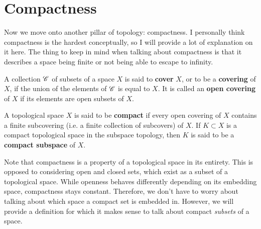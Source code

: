 \section{Compactness} 

  Now we move onto another pillar of topology: compactness. I personally think compactness is the hardest conceptually, so I will provide a lot of explanation on it here. The thing to keep in mind when talking about compactness is that it describes a space being finite or not being able to escape to infinity.  
  
  \begin{definition}[Covers]
    A collection $\operatorname{\mathscr{C}}$ of subsets of a space $X$ is said to \textbf{cover} $X$, or to be a \textbf{covering} of $X$, if the union of the elements of $\operatorname{\mathscr{C}}$ is equal to $X$. It is called an \textbf{open covering} of $X$ if its elements are open subsets of $X$. 
  \end{definition}

  \begin{definition}
    A topological space $X$ is said to be \textbf{compact} if every open covering of $X$ contains a finite subcovering (i.e. a finite collection of subcovers) of $X$. If $K \subset X$ is a compact topological space in the subspace topology, then $K$ is said to be a \textbf{compact subspace} of $X$. 
  \end{definition}

  Note that compactness is a property of a topological space in its entirety. This is opposed to considering open and closed sets, which exist as a subset of a topological space. While openness behaves differently depending on its embedding space, compactness stays constant. Therefore, we don't have to worry about talking about which space a compact set is embedded in. 
  However, we will provide a definition for which it makes sense to talk about compact \textit{subsets} of a space. 

